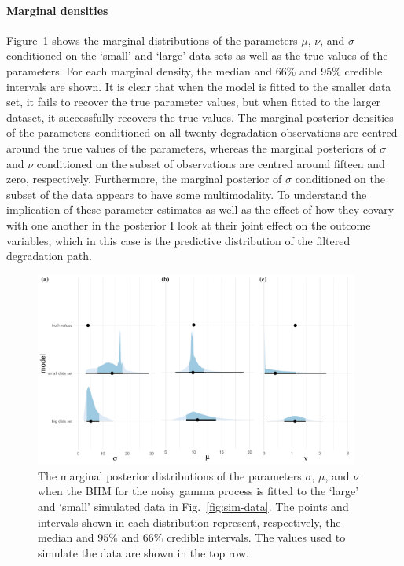 \paragraph*{Marginal densities}
Figure~\ref{fig:marginal-post} shows the marginal distributions of the parameters $\mu$, $\nu$, and $\sigma$ conditioned on the `small' and `large' data sets as well as the true values of the parameters. For each marginal density, the median and 66\% and 95\% credible intervals are shown. It is clear that when the model is fitted to the smaller data set, it fails to recover the true parameter values, but when fitted to the larger dataset, it successfully recovers the true values. The marginal posterior densities of the parameters conditioned on all twenty degradation observations are centred around the true values of the parameters, whereas the marginal posteriors of $\sigma$ and $\nu$ conditioned on the subset of observations are centred around fifteen and zero, respectively. Furthermore, the marginal posterior of $\sigma$ conditioned on the subset of the data appears to have some multimodality. To understand the implication of these parameter estimates as well as the effect of how they covary with one another in the posterior I look at their joint effect on the outcome variables, which in this case is the predictive distribution of the filtered degradation path.

\begin{figure}[tbp]
  \centering
  \includegraphics[width=0.95\textwidth]{./figures/ch-4/marginal-posterior_a.pdf}
  \caption{The marginal posterior distributions of the parameters $\sigma$, $\mu$, and $\nu$ when the BHM for the noisy gamma process is fitted to the `large' and `small' simulated data in Fig.~\ref{fig:sim-data}. The points and intervals shown in each distribution represent, respectively, the median and $95\%$ and $66\%$ credible intervals. The values used to simulate the data are shown in the top row.}
  \label{fig:marginal-post}
\end{figure}

